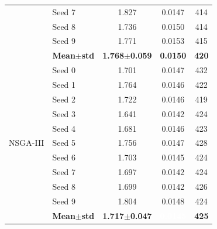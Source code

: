 \begin{table}[H]
\begin{tabular}{@{}llccc@{}}
  & Seed 7 & {\small 1.827} & {\small 0.0147} & {\small 414} \\
  & Seed 8 & {\small 1.736} & {\small 0.0150} & {\small 414} \\
  & Seed 9 & {\small 1.771} & {\small 0.0153} & {\small 415} \\
  & \textbf{Mean$\pm$std} & \textbf{1.768$\pm$0.059} & \cellcolor{ForestGreen!25}\textbf{0.0150} & \textbf{420} \\
\midrule
\multirow{11}{*}{NSGA-III}
  & Seed 0 & {\small 1.701} & {\small 0.0147} & {\small 432} \\
  & Seed 1 & {\small 1.764} & {\small 0.0146} & {\small 422} \\
  & Seed 2 & {\small 1.722} & {\small 0.0146} & {\small 419} \\
  & Seed 3 & {\small 1.641} & {\small 0.0142} & {\small 424} \\
  & Seed 4 & {\small 1.681} & {\small 0.0146} & {\small 423} \\
  & Seed 5 & {\small 1.756} & {\small 0.0147} & {\small 428} \\
  & Seed 6 & {\small 1.703} & {\small 0.0145} & {\small 424} \\
  & Seed 7 & {\small 1.697} & {\small 0.0142} & {\small 424} \\
  & Seed 8 & {\small 1.699} & {\small 0.0142} & {\small 426} \\
  & Seed 9 & {\small 1.804} & {\small 0.0148} & {\small 424} \\
  & \textbf{Mean$\pm$std} & \textbf{1.717$\pm$0.047} & \cellcolor{ForestGreen!55}\textcolor{white}{\textbf{0.0145}} & \textbf{425} \\
\bottomrule
\end{tabular}
\end{table}

